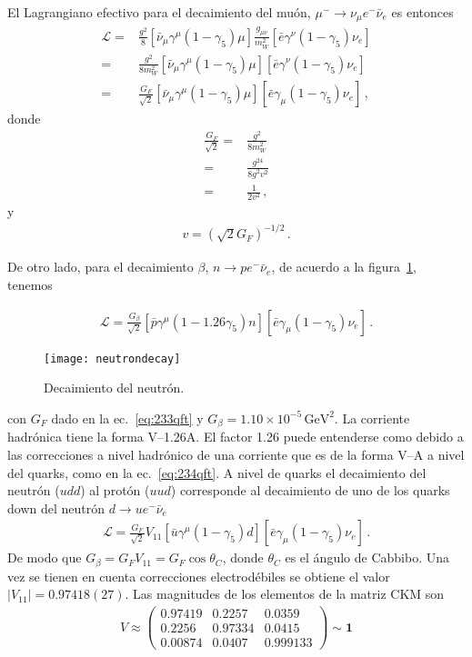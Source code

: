 El Lagrangiano efectivo para el decaimiento del muón, $\mu^-\to \nu_\mu e^- \bar{\nu}_e$ es entonces
\begin{align}
  \mathcal{L}=&\frac{g^2}{8}\left[\bar{\nu}_\mu\gamma^\mu(1-\gamma_5)\mu\right]\frac{g_{\mu\nu}}{m_W^2}
  \left[\bar{e}\gamma^\nu(1-\gamma_5)\nu_e\right]\nonumber\\
=&\frac{g^2}{8m_W^2}\left[\bar{\nu}_\mu\gamma^\mu(1-\gamma_5)\mu\right]
  \left[\bar{e}\gamma^\nu(1-\gamma_5)\nu_e\right]\nonumber\\
  =&\frac{G_F}{\sqrt{2}}\left[\bar{\nu}_\mu\gamma^\mu(1-\gamma_5)\mu\right]\left[\bar{e}\gamma_\mu(1-\gamma_5)\nu_e\right]\,,
\end{align}
donde
\begin{align}
  \frac{G_F}{\sqrt{2}}=&\frac{g^2}{8m_W^2}\nonumber\\
  =&\frac{g^24}{8g^2v^2}\nonumber\\
  =&\frac{1}{2v^2}\,,
\end{align}
y
\begin{align}
  v=\left(\sqrt{2}G_F\right)^{-1/2}\,.
\end{align}


De otro lado, para el  decaimiento $\beta$, $n\to p e^- \bar{\nu}_e$, de acuerdo a la figura~\ref{fig:neutrondecay}, tenemos

\begin{align}
    \mathcal{L}=\frac{G_\beta}{\sqrt{2}}\left[\bar{p}\gamma^\mu(1-1.26\gamma_5)n\right]\left[\bar{e}\gamma_\mu(1-\gamma_5)\nu_e\right]\,.
\end{align}
\begin{figure}
  \centering
  \texttt{[image: neutrondecay]}
  \caption{Decaimiento del neutrón.}
  \label{fig:neutrondecay}
\end{figure}
con $G_F$ dado en la ec.~\eqref{eq:233qft} y $G_\beta=1.10\times 10^{-5}\,\text{GeV}^2$. La corriente hadrónica tiene la forma V--1.26A. El factor 1.26  puede entenderse como debido a las correcciones a nivel hadrónico de una corriente que es de la forma V--A a nivel del quarks, como en la ec.~\eqref{eq:234qft}. A nivel de quarks el decaimiento del neutrón ($udd$) al protón ($uud$) corresponde al decaimiento de uno de los quarks down del neutrón $d\to u e^- \bar{\nu}_e$
\begin{align}
    \mathcal{L}=\frac{G_F}{\sqrt{2}}V_{11}\left[\bar{u}\gamma^\mu(1-\gamma_5)d\right]\left[\bar{e}\gamma_\mu(1-\gamma_5)\nu_e\right]\,.
\end{align}
De modo que $G_\beta=G_F V_{11}=G_F\cos\theta_C$, donde $\theta_C$ es el ángulo de Cabbibo. Una vez se tienen en cuenta correcciones electrodébiles se obtiene el valor $|V_{11}|=0.97418(27)$\cite{PDG}. Las magnitudes de los elementos de la matriz CKM son\cite{PDG}
\begin{align}
  V\approx\begin{pmatrix}
    0.97419&0.2257&0.0359\\
    0.2256&0.97334&0.0415\\
    0.00874&0.0407&0.999133
  \end{pmatrix}\sim \mathbf{1}
\end{align}



%
